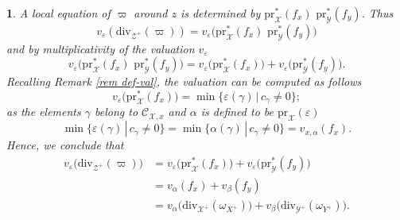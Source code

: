 \documentclass{amsart}%
\numberwithin{equation}{subsection}
\theoremstyle{plain2}
\theoremstyle{definition2}
\theoremstyle{stepstyle}
\theoremstyle{point}
\theoremstyle{subpoint}
\newtheorem{subpoint}[equation]{}%
\newcommand{\spa}[1]{\begin{subpoint}#1\end{subpoint}}           %
\newcommand{\cX}{\ensuremath{\mathscr{X}}}
\newcommand{\caC}{\ensuremath{\mathcal{C}}}
\newcommand{\cY}{\ensuremath{\mathscr{Y}}}
\newcommand{\cZ}{\ensuremath{\mathscr{Z}}}
\renewcommand{\cZ}{\ensuremath{\mathscr{Z}}}
\renewcommand{\cY}{\ensuremath{\mathscr{Y}}}
\newcommand{\pr}{\mathrm{pr}}
\newcommand{\divisor}{\mathrm{div}}
\begin{document}
\spa{A local equation of $\varpi$ around $z$ is determined by $\pr_{\cX}^*(f_x)\,\,\pr_{\cY}^*(f_y)$. Thus $$v_{\varepsilon}(\divisor_{\cZ^+}(\varpi))
= v_{\varepsilon}\big(\pr_{\cX}^*(f_x) \,\,\pr_{\cY}^*(f_y)\big)$$ and by multiplicativity of the valuation $v_{\varepsilon}$ $$v_{\varepsilon}\big(\pr_{\cX}^*(f_x) \,\,\pr_{\cY}^*(f_y)\big) = v_{\varepsilon}\big(\pr_{\cX}^*(f_x)\big) + v_{\varepsilon}\big(\pr_{\cY}^*(f_y)\big).$$ Recalling Remark \ref{rem def-val}, the valuation can be computed as follows $$ v_{\varepsilon}\big(\pr_{\cX}^*(f_x)\big) = \min\{\varepsilon(\gamma)\,|\,c_\gamma \neq 0\};$$ as the elements $\gamma$ belong to $\caC_{\cX,x}$ and $\alpha$ is defined to be $\pr_{\cX}(\varepsilon)$ $$\min\{\varepsilon(\gamma)\,|\,c_\gamma \neq 0\} = \min\{\alpha(\gamma)\,|\,c_\gamma \neq 0\} =  v_{x,\alpha}(f_x).$$ Hence, we conclude that \begin{align*}
v_{\varepsilon}\big(\divisor_{\cZ^+}(\varpi)\big)
& = v_{\varepsilon}\big(\pr_{\cX}^*(f_x)\big) + v_{\varepsilon}\big(\pr_{\cY}^*(f_y)\big)\\
& = v_{\alpha}(f_x) + v_{\beta}(f_y) \\
& = v_{\alpha}\big(\divisor_{\cX^+}(\omega_{X^+})\big) + v_{\beta}\big(\divisor_{\cY^+}(\omega_{Y^+})\big).
\end{align*}

}
\end{document}
